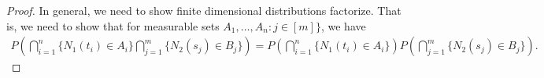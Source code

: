 \documentclass[a4paper,10pt,english]{article}
\begin{document}
\begin{proof}
In general, we need to show finite dimensional distributions factorize. That is, we need to show that for measurable sets $A_1, \hdots, A_n: j \in [m]\}$, we have \begin{align*}
   P\left(\bigcap_{i=1}^n\{N_{1}(t_{i})\in A_{i}\}\bigcap_{j=1}^m\{N_{2}(s_{j})\in B_{j}\}\right)
   =P\left(\bigcap_{i=1}^n\{N_{1}(t_{i})\in A_{i}\}\right)P\left(\bigcap_{j=1}^m\{N_{2}(s_{j})\in B_{j}\}\right).
\end{align*}
\end{proof}
\end{document}
